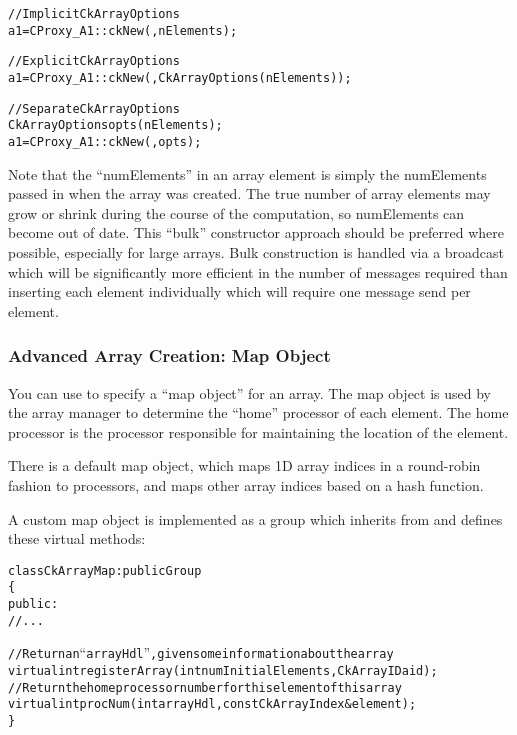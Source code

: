 \begin{alltt}
//Implicit CkArrayOptions
  a1=CProxy_A1::ckNew(,nElements);

//Explicit CkArrayOptions
  a1=CProxy_A1::ckNew(,CkArrayOptions(nElements));

//Separate CkArrayOptions
  CkArrayOptions opts(nElements);
  a1=CProxy_A1::ckNew(,opts);
\end{alltt}

Note that the ``numElements'' in an array element is simply the
numElements passed in when the array was created.  The true number of
array elements may grow or shrink during the course of the
computation, so numElements can become out of date.  This ``bulk''
constructor approach should be preferred where possible, especially
for large arrays.  Bulk construction is handled via a broadcast which
will be significantly more efficient in the number of messages
required than inserting each element individually which will require
one message send per element.

\subsubsection{Advanced Array Creation: Map Object}

\label{array map}

You can use  to specify a ``map object''
for an array.  The map object is used by the array manager
to determine the ``home'' processor of each element.  The
home processor is the processor responsible for maintaining
the location of the element.

There is a default map object, which maps 1D array indices
in a round-robin fashion to processors, and maps other array
indices based on a hash function.

A custom map object is implemented as a group which inherits from
 and defines these virtual methods:

\begin{alltt}
class CkArrayMap : public Group
\{
public:
  //...
  
  //Return an ``arrayHdl'', given some information about the array
  virtual int registerArray(int numInitialElements,CkArrayID aid);
  //Return the home processor number for this element of this array
  virtual int procNum(int arrayHdl,const CkArrayIndex &element);
\}
\end{alltt}

